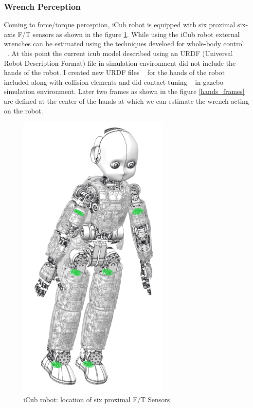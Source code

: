 \documentclass[12pt,a4paper]{report}
\begin{document}
\subsubsection*{Wrench Perception}
Coming to force/torque perception, iCub robot is equipped with six proximal six-axis F/T sensors as shown in the figure \ref{icub_ft}. While using the iCub robot external wrenches can be estimated using the techniques develoed for whole-body control ~\cite{nori2015icub}. At this point the current icub model described using an URDF (Universal Robot Description Format) file in simulation environment did not include the hands of the robot. I created new URDF files ~\cite{icub_hands_urdf} for the hands of the robot included along with collision elements and did contact tuning ~\cite{icub_hands_contact_tuning} in gazebo simulation environment. Later two frames as shown in the figure \ref{hands_frames} are defined at the center of the hands at which we can estimate the wrench acting on the robot. 

\begin{figure}[H]
  \centering
  \includegraphics[scale=0.5]{figures/icub_ft.png}
  \caption{iCub robot: location of six proximal F/T Sensors}
  \label{icub_ft}
\end{figure}
\end{document}
